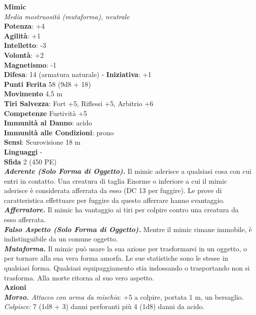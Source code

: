 \begin{multicols}{2}
\medskip\textbf{Mimic}\\
\emph{Media mostruosità (mutaforma), neutrale}\\
\textbf{Potenza}: +4\\
\textbf{Agilità}: +1\\
\textbf{Intelletto}: -3\\
\textbf{Volontà}: +2\\
\textbf{Magnetismo}: -1\\
\textbf{Difesa}: 14 (armatura naturale) - \textbf{Iniziativa}: +1\\
\textbf{Punti Ferita} 58 (9d8 + 18)\\
\textbf{Movimento} 4,5 m\\
\textbf{Tiri Salvezza}: Fort +5, Riflessi +5, Arbitrio +6\\
\textbf{Competenze} Furtività +5\\
\textbf{Immunità al Danno}: acido\\
\textbf{Immunità alle Condizioni}: prono\\
\textbf{Sensi}: Scurovisione 18 m\\
\textbf{Linguaggi} -\\
\textbf{Sfida} 2 (450 PE)\smallskip\\
\emph{\textbf{Aderente (Solo Forma di Oggetto).}} Il mimic aderisce a qualsiasi cosa con cui entri in contatto. Una creatura di taglia Enorme o inferiore a cui il mimic aderisce è considerata afferrata da esso (DC 13 per fuggire). Le prove di caratteristica effettuare per fuggire da questo afferrare hanno svantaggio.\\
\emph{\textbf{Afferratore.}} Il mimic ha vantaggio ai tiri per colpire contro una creatura da esso afferrata.\\
\emph{\textbf{Falso Aspetto (Solo Forma di Oggetto).}} Mentre il mimic rimane immobile, è indistinguibile da un comune oggetto.\\
\emph{\textbf{Mutaforma.}} Il mimic può usare la sua azione per trasformarsi in un oggetto, o per tornare alla sua vera forma amorfa. Le sue statistiche sono le stesse in qualsiasi forma. Qualsiasi equipaggiamento stia indossando o trasportando non si trasforma. Alla morte ritorna al suo vero aspetto.\\
\smallskip\textbf{Azioni}\\
\emph{\textbf{Morso.} Attacco con arma da mischia}: +5 a colpire, portata 1 m, un bersaglio.\\
\emph{Colpisce:} 7 (1d8 + 3) danni perforanti più 4 (1d8) danni da acido.\\

\end{multicols}
